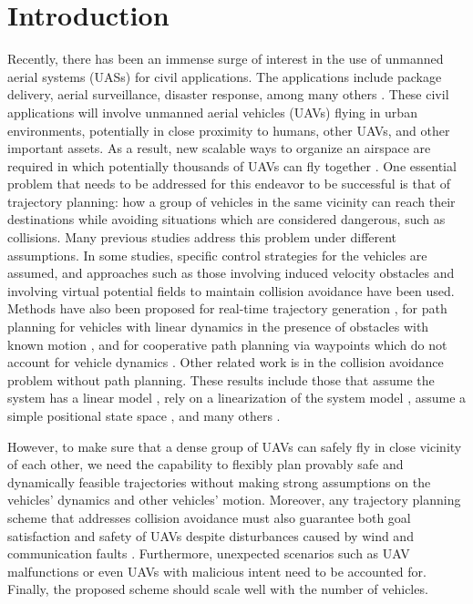 \section{Introduction \label{sec:introduction}}
Recently, there has been an immense surge of interest in the use of unmanned aerial systems (UASs) for civil applications. The applications include package delivery, aerial surveillance, disaster response, among many others \cite{Tice91, Debusk10, Amazon16, AUVSI16, BBC16}. These civil applications will involve unmanned aerial vehicles (UAVs) flying in urban environments, potentially in close proximity to humans, other UAVs, and other important assets. As a result, new scalable ways to organize an airspace are required in which potentially thousands of UAVs can fly together \cite{FAA13, Kopardekar16}.
One essential problem that needs to be addressed for this endeavor to be successful is that of trajectory planning: how a group of vehicles in the same vicinity can reach their destinations while avoiding situations which are considered dangerous, such as collisions. Many previous studies address this problem under different assumptions. In some studies, specific control strategies for the vehicles are assumed, and approaches such as those involving induced velocity obstacles \cite{Fiorini98, Chasparis05, Vandenberg08,Wu2012} and involving virtual potential fields to maintain collision avoidance \cite{Olfati-Saber2002, Chuang07} have been used. Methods have also been proposed for real-time trajectory generation \cite{Feng-LiLian2002}, for path planning for vehicles with linear dynamics in the presence of obstacles with known motion \cite{Ahmadzadeh2009}, and for cooperative path planning via waypoints which do not account for vehicle dynamics \cite{Bellingham}. Other related work is in the collision avoidance problem without path planning. These results include those that assume the system has a linear model \cite{Beard2003, Schouwenaars2004, Stipanovic2007}, rely on a linearization of the system model \cite{Massink2001, Althoff2011}, assume a simple positional state space \cite{Lin2015}, and many others \cite{Lalish2008, Hoffmann2008, Chen2016}.

However, to make sure that a dense group of UAVs can safely fly in close vicinity of each other, we need the capability to flexibly plan provably safe and dynamically feasible trajectories without making strong assumptions on the vehicles' dynamics and other vehicles' motion. Moreover, any trajectory planning scheme that addresses collision avoidance must also guarantee both goal satisfaction and safety of UAVs despite disturbances caused by wind and communication faults \cite{Kopardekar16}. Furthermore, unexpected scenarios such as UAV malfunctions or even UAVs with malicious intent need to be accounted for. Finally, the proposed scheme should scale well with the number of vehicles.


